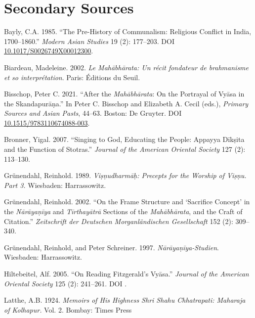 \section*{Secondary Sources}
\begin{hangparas}{0.125in}{1}

          
          \label{Bayly1985}Bayly, C.\thinskip{}A. 1985. “The Pre-History of Communalism: Religious Conflict in India, 1700–1860.” \emph{Modern Asian Studies} 19 (2): 177–203. DOI \href{https://doi.org/10.1017/S0026749X00012300}{10.1017/S0026749X00012300}.\medskip


          \label{Biardeau2002}Biardeau, Madeleine. 2002. \emph{Le Mahābhārata: Un récit fondateur de brahmanisme et so interprétation}. Paris: Éditions du Seuil.\medskip


          \label{Bisschop2021}Bisschop, Peter C. 2021. “After the \emph{Mahābhārata}: On the Portrayal of Vyāsa in the Skandapurāṇa.” In Peter C. Bisschop and Elizabeth A. Cecil (eds.),  \emph{Primary Sources and Asian Pasts}, 44–63. Boston: De Gruyter. DOI \href{https://doi.org/10.1515/9783110674088-003}{10.1515/9783110674088-003}.\medskip


          \label{Bronner2007}Bronner, Yigal. 2007. “Singing to God, Educating the People: Appayya Dīkṣita and the Function of Stotras.” \emph{Journal of the American Oriental Society} 127 (2): 113–130.\medskip


	  \label{Gruenendahl1989}Grünendahl, Reinhold. 1989. \emph{Viṣṇudharmāḥ: Precepts for the Worship of Viṣṇu. Part 3.} Wiesbaden: Harrassowitz.\medskip


	  \label{Gruenendahl2002}Grünendahl, Reinhold. 2002. “On the Frame Structure and ‘Sacrifice Concept’ in the \emph{{Nārāyaṇīya}} and \emph{{Tīrthayātrā}} Sections of the \emph{{Mahābhārata}}, and the Craft of Citation.” \emph{Zeitschrift der Deutschen Morganländischen Gesellschaft} 152 (2): 309–340.\medskip


          \label{Gruenendahl1997}Grünendahl, Reinhold, and Peter Schreiner. 1997. \emph{Nārāyaṇīya-Studien}. Wiesbaden: Harrassowitz.\medskip


          \label{Hiltebeitel2005}Hiltebeitel, Alf. 2005. “On Reading Fitzgerald’s Vyāsa.” \emph{Journal of the American Oriental Society} 125 (2): 241–261. DOI \href{https://doi.org/}{}.\medskip


          \label{Latthe1924}Latthe, A.\thinskip{}B. 1924. \emph{Memoirs of His Highness Shri Shahu Chhatrapati: Maharaja of Kolhapur.} Vol. 2. Bombay: Times Press\medskip



\end{hangparas}
